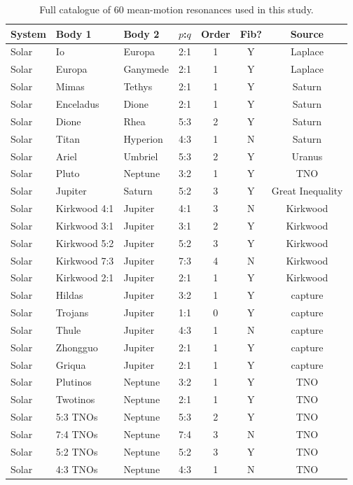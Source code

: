 \documentclass[twocolumn,11pt]{article}
\begin{document}
\begin{table}[ht]
\centering
\scriptsize
\caption{Full catalogue of 60 mean-motion resonances used in this study.}
\label{tab:catalogue}
\begin{tabular}{llllccc}
\toprule
System & Body 1 & Body 2 & $p$:$q$ & Order & Fib? & Source \\
\midrule
Solar & Io & Europa & 2:1 & 1 & Y & Laplace \\
Solar & Europa & Ganymede & 2:1 & 1 & Y & Laplace \\
Solar & Mimas & Tethys & 2:1 & 1 & Y & Saturn \\
Solar & Enceladus & Dione & 2:1 & 1 & Y & Saturn \\
Solar & Dione & Rhea & 5:3 & 2 & Y & Saturn \\
Solar & Titan & Hyperion & 4:3 & 1 & N & Saturn \\
Solar & Ariel & Umbriel & 5:3 & 2 & Y & Uranus \\
Solar & Pluto & Neptune & 3:2 & 1 & Y & TNO \\
Solar & Jupiter & Saturn & 5:2 & 3 & Y & Great Inequality \\
Solar & Kirkwood 4:1 & Jupiter & 4:1 & 3 & N & Kirkwood \\
Solar & Kirkwood 3:1 & Jupiter & 3:1 & 2 & Y & Kirkwood \\
Solar & Kirkwood 5:2 & Jupiter & 5:2 & 3 & Y & Kirkwood \\
Solar & Kirkwood 7:3 & Jupiter & 7:3 & 4 & N & Kirkwood \\
Solar & Kirkwood 2:1 & Jupiter & 2:1 & 1 & Y & Kirkwood \\
Solar & Hildas & Jupiter & 3:2 & 1 & Y & capture \\
Solar & Trojans & Jupiter & 1:1 & 0 & Y & capture \\
Solar & Thule & Jupiter & 4:3 & 1 & N & capture \\
Solar & Zhongguo & Jupiter & 2:1 & 1 & Y & capture \\
Solar & Griqua & Jupiter & 2:1 & 1 & Y & capture \\
Solar & Plutinos & Neptune & 3:2 & 1 & Y & TNO \\
Solar & Twotinos & Neptune & 2:1 & 1 & Y & TNO \\
Solar & 5:3 TNOs & Neptune & 5:3 & 2 & Y & TNO \\
Solar & 7:4 TNOs & Neptune & 7:4 & 3 & N & TNO \\
Solar & 5:2 TNOs & Neptune & 5:2 & 3 & Y & TNO \\
Solar & 4:3 TNOs & Neptune & 4:3 & 1 & N & TNO \\

\end{tabular}
\end{table}
\end{document}
